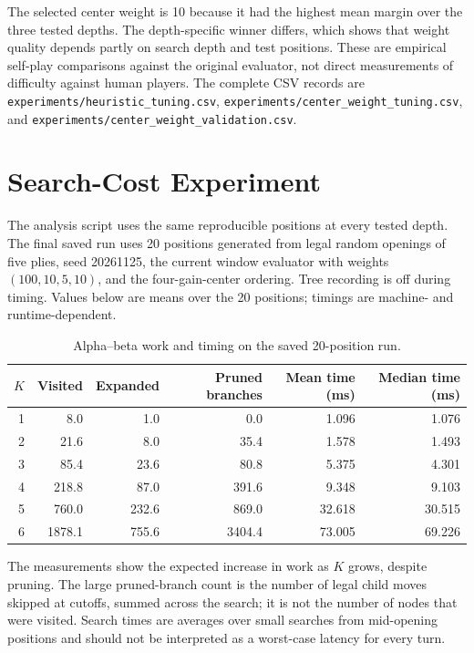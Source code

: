 \documentclass[11pt,a4paper]{article}
\begin{document}
The selected center weight is 10 because it had the highest mean margin over
the three tested depths. The depth-specific winner differs, which shows that
weight quality depends partly on search depth and test positions. These are
empirical self-play comparisons against the original evaluator, not direct
measurements of difficulty against human players. The complete CSV records are
\texttt{experiments/heuristic\_tuning.csv},
\texttt{experiments/center\_weight\_tuning.csv}, and
\texttt{experiments/center\_weight\_validation.csv}.

\section{Search-Cost Experiment}

The analysis script uses the same reproducible positions at every tested
depth. The final saved run uses 20 positions generated from legal random
openings of five plies, seed 20261125, the current window evaluator with
weights $(100,10,5,10)$, and the four-gain-center ordering. Tree recording is
off during timing. Values below
are means over the 20 positions; timings are machine- and runtime-dependent.

\begin{table}[ht]
\centering
\caption{Alpha--beta work and timing on the saved 20-position run.}
\begin{tabular}{rrrrrr}
\toprule
$K$ & Visited & Expanded & Pruned branches & Mean time (ms) & Median time (ms)\\
\midrule
1 & 8.0 & 1.0 & 0.0 & 1.096 & 1.076\\
2 & 21.6 & 8.0 & 35.4 & 1.578 & 1.493\\
3 & 85.4 & 23.6 & 80.8 & 5.375 & 4.301\\
4 & 218.8 & 87.0 & 391.6 & 9.348 & 9.103\\
5 & 760.0 & 232.6 & 869.0 & 32.618 & 30.515\\
6 & 1878.1 & 755.6 & 3404.4 & 73.005 & 69.226\\
\bottomrule
\end{tabular}
\end{table}

The measurements show the expected increase in work as $K$ grows, despite
pruning. The large pruned-branch count is the number of legal child moves
skipped at cutoffs, summed across the search; it is not the number of nodes
that were visited. Search times are averages over small searches from
mid-opening positions and should not be interpreted as a worst-case latency
for every turn.
\end{document}
